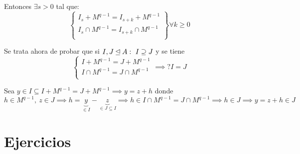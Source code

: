 \documentclass[openany]{book}
\begin{document}
\begin{demonstration}
Entonces $ \exists s > 0 $ tal que:
$$ 
\left\{
    \begin{array}{l}
    I_{s}+M^{q-1} = I_{s+k} + M^{q-1}\\
    I_{s}\cap M^{q-1} = I_{s+k} \cap M^{q-1}\\
\end{array}
\right\} \forall k \geq  0
$$

Se trata ahora de probar que si $ I,J \unlhd A:\ I \supseteq J $ y se tiene
$$ \left\{
    \begin{array}{l}
        I + M^{q-1} = J+M^{q-1}\\
    I \cap  M^{q-1} = J\cap M^{q-1}\\
\end{array}
\right. \implies? I =  J$$

Sea $ y \in I \subseteq  I + M^{q-1}= J+ M ^{q-1} \implies y = z+h $ donde $ h \in M^{q-1},\ z \in J \implies h = \underbrace{y}_{\in I}-\underbrace{z}_{\in J \subseteq I} \implies h \in I \cap M^{q-1} = J \cap M^{q-1} \implies h \in J \implies y = z+h \in J  $

\end{demonstration}


\section{Ejercicios}
\end{document}
